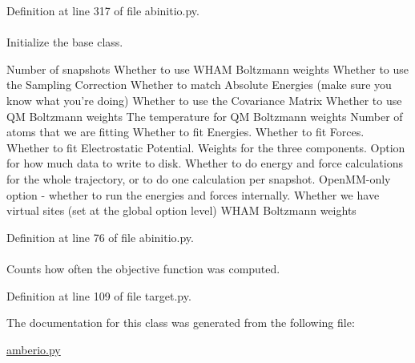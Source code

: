 \-Definition at line 317 of file abinitio.\-py.

\hypertarget{classforcebalance_1_1abinitio_1_1AbInitio_ae5c60f421336c2ecb716be16b8d51fdf}{
\paragraph[{whamboltz\-\_\-wts}]{}}\label{classforcebalance_1_1abinitio_1_1AbInitio_ae5c60f421336c2ecb716be16b8d51fdf}


\-Initialize the base class. 

\-Number of snapshots \-Whether to use \-W\-H\-A\-M \-Boltzmann weights \-Whether to use the \-Sampling \-Correction \-Whether to match \-Absolute \-Energies (make sure you know what you're doing) \-Whether to use the \-Covariance \-Matrix \-Whether to use \-Q\-M \-Boltzmann weights \-The temperature for \-Q\-M \-Boltzmann weights \-Number of atoms that we are fitting \-Whether to fit \-Energies. \-Whether to fit \-Forces. \-Whether to fit \-Electrostatic \-Potential. \-Weights for the three components. \-Option for how much data to write to disk. \-Whether to do energy and force calculations for the whole trajectory, or to do one calculation per snapshot. \-Open\-M\-M-\/only option -\/ whether to run the energies and forces internally. \-Whether we have virtual sites (set at the global option level) \-W\-H\-A\-M \-Boltzmann weights 

\-Definition at line 76 of file abinitio.\-py.

\hypertarget{classforcebalance_1_1target_1_1Target_ad4cd0ab38d8fc97d3e7a6e22ce130a16}{
\paragraph[{xct}]{}}\label{classforcebalance_1_1target_1_1Target_ad4cd0ab38d8fc97d3e7a6e22ce130a16}


\-Counts how often the objective function was computed. 



\-Definition at line 109 of file target.\-py.



\-The documentation for this class was generated from the following file\-:\begin{DoxyCompactItemize}
\item 
\hyperlink{amberio_8py}{amberio.\-py}\end{DoxyCompactItemize}
